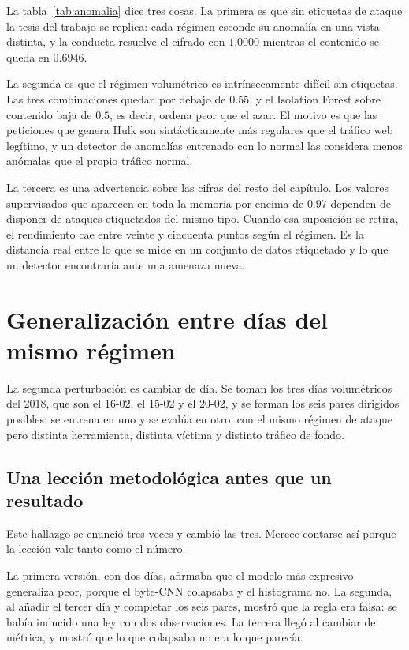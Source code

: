 La tabla~\ref{tab:anomalia} dice tres cosas. La primera es que sin etiquetas de
ataque la tesis del trabajo se replica: cada régimen esconde su anomalía en una
vista distinta, y la conducta resuelve el cifrado con $1.0000$ mientras el
contenido se queda en $0.6946$.

La segunda es que el régimen volumétrico es intrínsecamente difícil sin
etiquetas. Las tres combinaciones quedan por debajo de $0.55$, y el
Isolation Forest sobre contenido baja de $0.5$, es decir, ordena peor que el
azar. El motivo es que las peticiones que genera Hulk son sintácticamente más
regulares que el tráfico web legítimo, y un detector de anomalías
entrenado con lo normal las considera menos anómalas que el propio tráfico
normal.

La tercera es una advertencia sobre las cifras del resto del capítulo. Los
valores supervisados que aparecen en toda la memoria por encima de $0.97$
dependen de disponer de ataques etiquetados del mismo tipo. Cuando esa
suposición se retira, el rendimiento cae entre veinte y cincuenta puntos según el
régimen. Es la distancia real entre lo que se mide en un conjunto de datos
etiquetado y lo que un detector encontraría ante una amenaza nueva.

\section{Generalización entre días del mismo régimen}
\label{sec:cross-dia}

La segunda perturbación es cambiar de día. Se toman los tres días volumétricos
del 2018, que son el 16-02, el 15-02 y el 20-02, y se forman los seis pares
dirigidos posibles: se entrena en uno y se evalúa en otro, con el mismo régimen
de ataque pero distinta herramienta, distinta víctima y distinto tráfico de
fondo.

\subsection*{Una lección metodológica antes que un resultado}

Este hallazgo se enunció tres veces y cambió las tres. Merece contarse así
porque la lección vale tanto como el número.

La primera versión, con dos días, afirmaba que el modelo más expresivo
generaliza peor, porque el byte-CNN colapsaba y el histograma no. La segunda, al
añadir el tercer día y completar los seis pares, mostró que la regla era falsa:
se había inducido una ley con dos observaciones. La tercera llegó al cambiar de
métrica, y mostró que lo que colapsaba no era lo que parecía.

